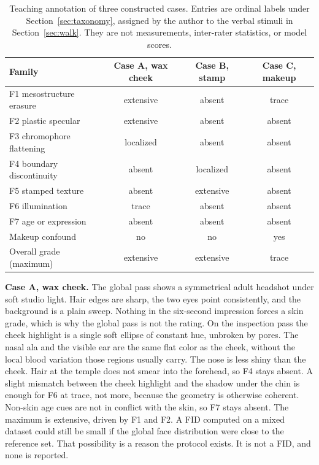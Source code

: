 \documentclass[10pt,twocolumn]{article}
\begin{document}
\begin{table}[t]
\centering
\caption{Teaching annotation of three constructed cases. Entries are ordinal labels under Section~\ref{sec:taxonomy}, assigned by the author to the verbal stimuli in Section~\ref{sec:walk}. They are not measurements, inter-rater statistics, or model scores.}
\label{tab:teach}
\footnotesize
\begin{tabular}{@{}lccc@{}}
\toprule
Family & Case A, wax cheek & Case B, stamp & Case C, makeup \\
\midrule
F1 mesostructure erasure & extensive & absent & trace \\
F2 plastic specular & extensive & absent & absent \\
F3 chromophore flattening & localized & absent & absent \\
F4 boundary discontinuity & absent & localized & absent \\
F5 stamped texture & absent & extensive & absent \\
F6 illumination & trace & absent & absent \\
F7 age or expression & absent & absent & absent \\
Makeup confound & no & no & yes \\
Overall grade (maximum) & extensive & extensive & trace \\
\bottomrule
\end{tabular}
\end{table}

\textbf{Case A, wax cheek.}
The global pass shows a symmetrical adult headshot under soft studio light. Hair edges are sharp, the two eyes point consistently, and the background is a plain sweep. Nothing in the six-second impression forces a skin grade, which is why the global pass is not the rating. On the inspection pass the cheek highlight is a single soft ellipse of constant hue, unbroken by pores. The nasal ala and the visible ear are the same flat color as the cheek, without the local blood variation those regions usually carry. The nose is less shiny than the cheek. Hair at the temple does not smear into the forehead, so F4 stays absent. A slight mismatch between the cheek highlight and the shadow under the chin is enough for F6 at trace, not more, because the geometry is otherwise coherent. Non-skin age cues are not in conflict with the skin, so F7 stays absent. The maximum is extensive, driven by F1 and F2. A FID computed on a mixed dataset could still be small if the global face distribution were close to the reference set. That possibility is a reason the protocol exists. It is not a FID, and none is reported.
\end{document}
